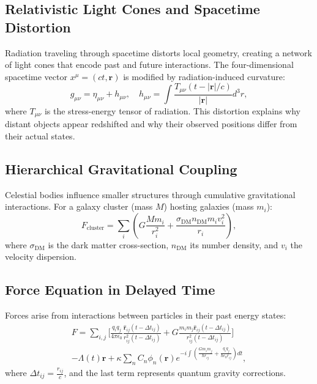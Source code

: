 \documentclass{article}
\begin{document}
\subsection{Relativistic Light Cones and Spacetime Distortion}
Radiation traveling through spacetime distorts local geometry, creating a network of light cones that encode past and future interactions. The four-dimensional spacetime vector \( x^\mu = (ct, \bm{r}) \) is modified by radiation-induced curvature:
\begin{equation}
g_{\mu\nu} = \eta_{\mu\nu} + h_{\mu\nu}, \quad h_{\mu\nu} = \int \frac{T_{\mu\nu}(t - |\bm{r}|/c)}{|\bm{r}|} d^3r, \label{eq:metric_pert}
\end{equation}
where \( T_{\mu\nu} \) is the stress-energy tensor of radiation. This distortion explains why distant objects appear redshifted and why their observed positions differ from their actual states.

\subsection{Hierarchical Gravitational Coupling}
Celestial bodies influence smaller structures through cumulative gravitational interactions. For a galaxy cluster (mass \( M \)) hosting galaxies (mass \( m_i \)):
\begin{equation}
F_{\text{cluster}} = \sum_i \left( G \frac{M m_i}{r_i^2} + \frac{\sigma_{\text{DM}} n_{\text{DM}} m_i v_i^2}{r_i} \right), \label{eq:hierarchy}
\end{equation}
where \( \sigma_{\text{DM}} \) is the dark matter cross-section, \( n_{\text{DM}} \) its number density, and \( v_i \) the velocity dispersion.

\subsection{Force Equation in Delayed Time}
Forces arise from interactions between particles in their past energy states:
\begin{multline}
F = \sum_{i,j} \Bigg[ \frac{q_i q_j}{4\pi \epsilon_0} \frac{\hat{\bm{r}}_{ij}(t - \Delta t_{ij})}{r_{ij}^2(t - \Delta t_{ij})} + G \frac{m_i m_j \hat{\bm{r}}_{ij}(t - \Delta t_{ij})}{r_{ij}^2(t - \Delta t_{ij})} \Bigg] \\
- \Lambda(t) \bm{r} + \kappa \sum_{n} C_n \phi_n(\bm{r}) e^{-i \int \left( \frac{G m_i m_j}{\hbar r_{ij}} + \frac{q_i q_j}{\hbar \epsilon_0 r_{ij}} \right) dt}, \label{eq:force}
\end{multline}
where \( \Delta t_{ij} = \frac{r_{ij}}{c} \), and the last term represents quantum gravity corrections.
\end{document}
